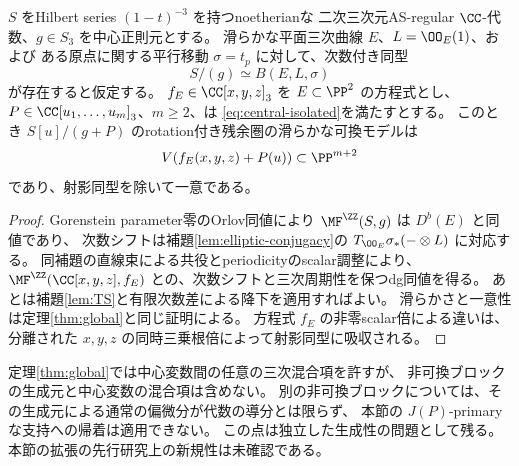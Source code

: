 \begin{corollary}[平行移動を伴う一般の楕円ブロック]\label{cor:elliptic-central-cubic}
 \(S\) をHilbert series \((1-t)^{-3}\) を持つnoetherianな
 二次三次元AS-regular \(\CC\)-代数、\(g\in S_3\) を中心正則元とする。
 滑らかな平面三次曲線 \(E\)、\(L=\OO_E(1)\)、および
 ある原点に関する平行移動 \(\sigma=t_p\) に対して、次数付き同型
 \[
 S/(g)\simeq B(E,L,\sigma)
 \]
 が存在すると仮定する。
 \(f_E\in\CC[x,y,z]_3\) を \(E\subset\PP^2\) の方程式とし、
 \(P\in\CC[u_1,\ldots,u_m]_3\)、\(m\ge2\)、は
 \eqref{eq:central-isolated}を満たすとする。
 このとき \(S[u]/(g+P)\) のrotation付き残余圏の滑らかな可換モデルは
 \[
 V(f_E(x,y,z)+P(u))\subset\PP^{m+2}
 \]
 であり、射影同型を除いて一意である。
\end{corollary}
\begin{proof}
 Gorenstein parameter零のOrlov同値により
 \(\MF^\ZZ(S,g)\) は \(D^b(E)\) と同値であり、
 次数シフトは補題\ref{lem:elliptic-conjugacy}の
 \(T_{\OO_E}\sigma_*(-\otimes L)\) に対応する。
 同補題の直線束による共役とperiodicityのscalar調整により、
 \(\MF^\ZZ(\CC[x,y,z],f_E)\) との、次数シフトと三次周期性を保つdg同値を得る。
 あとは補題\ref{lem:TS}と有限次数差による降下を適用すればよい。
 滑らかさと一意性は定理\ref{thm:global}と同じ証明による。
 方程式 \(f_E\) の非零scalar倍による違いは、
 分離された \(x,y,z\) の同時三乗根倍によって射影同型に吸収される。
\end{proof}

\begin{remark}[この拡張の範囲]
 定理\ref{thm:global}では中心変数間の任意の三次混合項を許すが、
 非可換ブロックの生成元と中心変数の混合項は含めない。
 別の非可換ブロックについては、その生成元による通常の偏微分が代数の導分とは限らず、
 本節の \(J(P)\)-primaryな支持への帰着は適用できない。
 この点は独立した生成性の問題として残る。
 本節の拡張の先行研究上の新規性は未確認である。
\end{remark}


